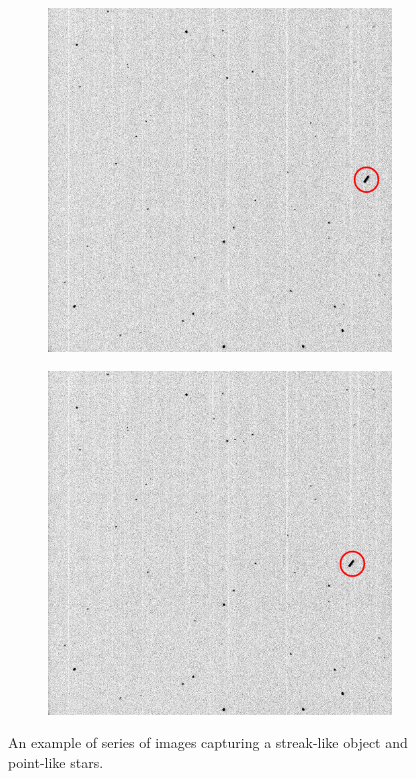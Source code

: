 \begin{figure}[!h]
\begin{subfigure}{.3\textwidth}
        \includegraphics[width=\textwidth]{images/PointStreak2.png}
        \label{fig:pointstreak2}
    \end{subfigure}
    \hfill
    \begin{subfigure}{.3\textwidth}
        \centering
        \includegraphics[width=\textwidth]{images/PointStreak3.png}
        \label{fig:pointstreak3}
    \end{subfigure}
    \hfill
    \caption{An example of series of images capturing a streak-like object and point-like stars. }
    \label{fig:pointstreak0}
\end{figure}

